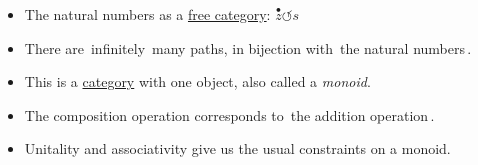 \begin{itemize}
    \item The natural numbers as a \hyperref[D3.7]{free category}: $\boxed{\overset{\bullet}{z}\circlearrowleft s}$
    \item There are \,infinitely\, many paths, in bijection with \,the natural numbers\,.
    \item This is a \hyperref[D3.6]{category} with one object, also called a \emph{monoid}.
    \item The composition operation corresponds to \,the addition operation\,.
    \item Unitality and associativity give us the usual constraints on a monoid.
  \end{itemize}